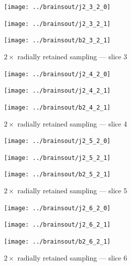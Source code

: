 \documentclass{article}
\begin{document}
\begin{figure}
\begin{centering}

\parbox{\imsizes}{\texttt{[image: ../brainsout/j2\_3\_2\_0]}}

\vspace{\vertseps}

\parbox{\imsizes}{\texttt{[image: ../brainsout/j2\_3\_2\_1]}}
\hfill
\parbox{\imsizes}{\texttt{[image: ../brainsout/b2\_3\_2\_1]}}

\end{centering}
\caption{$2\times$ radially retained sampling --- slice 3}
\end{figure}


\begin{figure}
\begin{centering}

\parbox{\imsizes}{\texttt{[image: ../brainsout/j2\_4\_2\_0]}}

\vspace{\vertseps}

\parbox{\imsizes}{\texttt{[image: ../brainsout/j2\_4\_2\_1]}}
\hfill
\parbox{\imsizes}{\texttt{[image: ../brainsout/b2\_4\_2\_1]}}

\end{centering}
\caption{$2\times$ radially retained sampling --- slice 4}
\end{figure}


\begin{figure}
\begin{centering}

\parbox{\imsizes}{\texttt{[image: ../brainsout/j2\_5\_2\_0]}}

\vspace{\vertseps}

\parbox{\imsizes}{\texttt{[image: ../brainsout/j2\_5\_2\_1]}}
\hfill
\parbox{\imsizes}{\texttt{[image: ../brainsout/b2\_5\_2\_1]}}

\end{centering}
\caption{$2\times$ radially retained sampling --- slice 5}
\end{figure}


\begin{figure}
\begin{centering}

\parbox{\imsizes}{\texttt{[image: ../brainsout/j2\_6\_2\_0]}}

\vspace{\vertseps}

\parbox{\imsizes}{\texttt{[image: ../brainsout/j2\_6\_2\_1]}}
\hfill
\parbox{\imsizes}{\texttt{[image: ../brainsout/b2\_6\_2\_1]}}

\end{centering}
\caption{$2\times$ radially retained sampling --- slice 6}
\end{figure}
\end{document}
